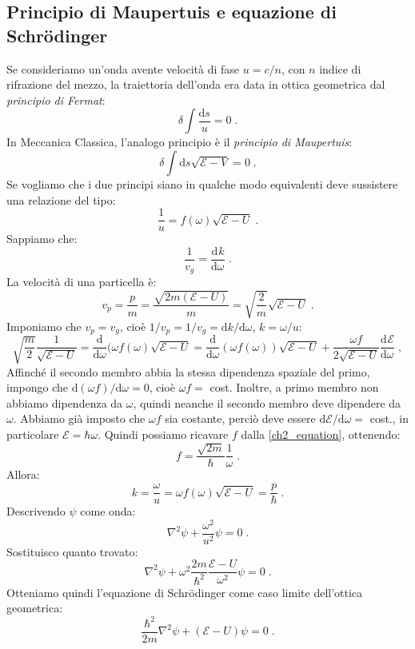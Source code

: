 \documentclass[12pt,a4paper]{report}
\theoremstyle{definition}
\newcommand{\dev}[3][]{\frac{\mathrm{d}^{#1} #2}{\mathrm{d} #3^{#1}}}
\numberwithin{equation}{section}
\newcommand{\diff}[1][]{\mathrm{d}#1}
\begin{document}
\subsection{Principio di Maupertuis e equazione di Schrödinger}
Se consideriamo un'onda avente velocità di fase $u=c/n$, con $n$ indice di rifrazione del mezzo, la traiettoria dell'onda era data in ottica geometrica dal \textit{principio di Fermat}:
\begin{equation}
\delta\int\frac{\diff{s}}{u}=0\;.
\end{equation}
In Meccanica Classica, l'analogo principio è il \textit{principio di Maupertuis}:
\begin{equation}
\delta\int\diff{s}\sqrt{\mathcal{E}-V}=0\;.
\end{equation}
Se vogliamo che i due principi siano in qualche modo equivalenti deve sussistere una relazione del tipo:
$$
\frac{1}{u}=f(\omega)\sqrt{\mathcal{E}-U}\;.
$$
Sappiamo che:
$$
\frac{1}{v_g}=\dev{k}{\omega}\;.
$$
La velocità di una particella è:
\begin{equation}
v_p=\frac{p}{m}=\frac{\sqrt{2m(\mathcal{E}-U)}}{m}=\sqrt{\frac{2}{m}}\sqrt{\mathcal{E}-U}\;.
\end{equation}
Imponiamo che $v_p=v_g$, cioè $1/v_p=1/v_g=\diff{k}/\diff{\omega}$, $k=\omega/u$:
\begin{equation}
\sqrt{\frac{m}{2}}\frac{1}{\sqrt{\mathcal{E}-U}}=\frac{\mathrm{d}}{\diff{\omega}}(\omega f(\omega)\sqrt{\mathcal{E}-U}=\frac{\mathrm{d}}{\diff{\omega}}(\omega f(\omega))\sqrt{\mathcal{E}-U}+\frac{\omega f}{2\sqrt{\mathcal{E}-U}}\dev{\mathcal{E}}{\omega}\;, \label{ch2_equation}
\end{equation}
Affinché il secondo membro abbia la stessa dipendenza spaziale del primo, impongo che $\diff{(\omega f)}/\diff{\omega}=0$, cioè $\omega f=$ cost. Inoltre, a primo membro non abbiamo dipendenza da $\omega$, quindi neanche il secondo membro deve dipendere da $\omega$. Abbiamo già imposto che $\omega f$ sia costante, perciò deve essere $\diff{\mathcal{E}}/\diff{\omega}=$ cost., in particolare $\mathcal{E}=\hbar\omega$. Quindi possiamo ricavare $f$ dalla \eqref{ch2_equation}, ottenendo:
\begin{equation}
f=\frac{\sqrt{2m}}{\hbar}\frac{1}{\omega}\;.
\end{equation}
Allora:
\begin{equation}
k=\frac{\omega}{u}=\omega f(\omega)\sqrt{\mathcal{E}-U}=\frac{p}{\hbar}\;.
\end{equation}
Descrivendo $\psi$ come onda:
$$
\nabla^2\psi+\frac{\omega^2}{u^2}\psi=0\;.
$$
Sostituisco quanto trovato:
$$
\nabla^2\psi+\omega^2\frac{2m}{\hbar^2}\frac{\mathcal{E}-U}{\omega^2}\psi=0\;.
$$
Otteniamo quindi l'equazione di Schrödinger come caso limite dell'ottica geometrica:
\begin{equation}
\frac{\hbar^2}{2m}\nabla^2\psi+(\mathcal{E}-U)\psi=0\;.
\end{equation}
\end{document}
